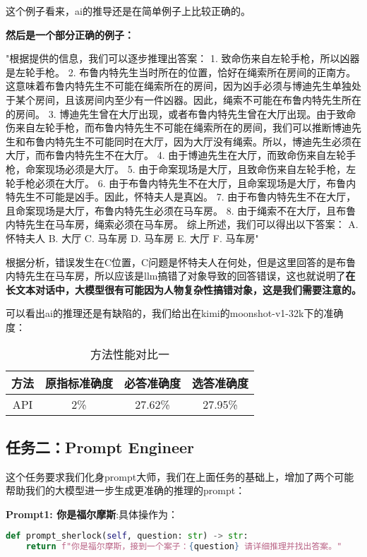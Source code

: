 \documentclass[answers]{exam}  %
\begin{document}
这个例子看来，ai的推导还是在简单例子上比较正确的。

\textbf{然后是一个部分正确的例子：}

"根据提供的信息，我们可以逐步推理出答案： 1. 致命伤来自左轮手枪，所以凶器是左轮手枪。 2. 布鲁内特先生当时所在的位置，恰好在绳索所在房间的正南方。这意味着布鲁内特先生不可能在绳索所在的房间，因为凶手必须与博迪先生单独处于某个房间，且该房间内至少有一件凶器。因此，绳索不可能在布鲁内特先生所在的房间。 3. 博迪先生曾在大厅出现，或者布鲁内特先生曾在大厅出现。由于致命伤来自左轮手枪，而布鲁内特先生不可能在绳索所在的房间，我们可以推断博迪先生和布鲁内特先生不可能同时在大厅，因为大厅没有绳索。所以，博迪先生必须在大厅，而布鲁内特先生不在大厅。 4. 由于博迪先生在大厅，而致命伤来自左轮手枪，命案现场必须是大厅。 5. 由于命案现场是大厅，且致命伤来自左轮手枪，左轮手枪必须在大厅。 6. 由于布鲁内特先生不在大厅，且命案现场是大厅，布鲁内特先生不可能是凶手。因此，怀特夫人是真凶。 7. 由于布鲁内特先生不在大厅，且命案现场是大厅，布鲁内特先生必须在马车房。 8. 由于绳索不在大厅，且布鲁内特先生在马车房，绳索必须在马车房。 综上所述，我们可以得出以下答案： A. 怀特夫人 B. 大厅 C. 马车房 D. 马车房 E. 大厅 F. 马车房"

根据分析，错误发生在C位置，C问题是怀特夫人在何处，但是这里回答的是布鲁内特先生在马车房，所以应该是llm搞错了对象导致的回答错误，这也就说明了\textbf{在长文本对话中，大模型很有可能因为人物复杂性搞错对象，这是我们需要注意的。}

可以看出ai的推理还是有缺陷的，我们给出在kimi的moonshot-v1-32k下的准确度：

\begin{table}[h]
    \centering
    \begin{tabular}{cccc}
    \toprule
    \textbf{方法} & \textbf{原指标准确度} & \textbf{必答准确度} &\textbf{选答准确度}\\
    \midrule
    API & 2\% & 27.62\% & 27.95\% \\
    \bottomrule
    \end{tabular}
    \caption{方法性能对比一}
\end{table}


\subsection{任务二：Prompt Engineer}

这个任务要求我们化身prompt大师，我们在上面任务的基础上，增加了两个可能帮助我们的大模型进一步生成更准确的推理的prompt：

\textbf{Prompt1: 你是福尔摩斯}:具体操作为：
\begin{lstlisting}[language=python]
    def prompt_sherlock(self, question: str) -> str:
    return f"你是福尔摩斯，接到一个案子：{question} 请详细推理并找出答案。"
\end{lstlisting}
\end{document}
